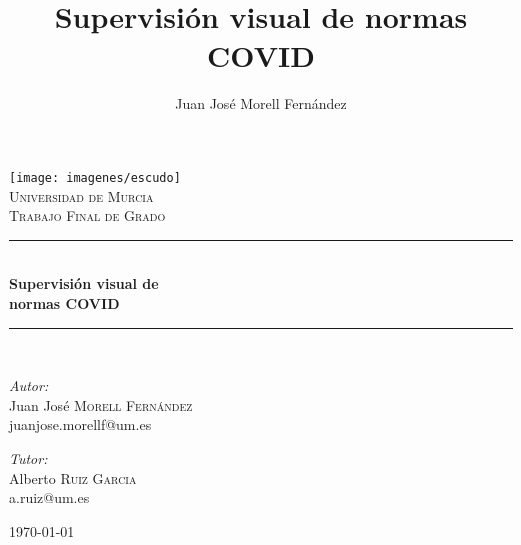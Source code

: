 \documentclass[a4paper,12pt]{book}
\newcommand{\HRule}{\rule{\linewidth}{0.5mm}}
\begin{document}
\title{Supervisión visual de normas COVID}
\author{Juan José Morell Fernández}

\begin{titlepage}
 
\begin{center}
 
\vfill

\texttt{[image: imagenes/escudo]}\\[2.5cm]
 
\textsc{\LARGE Universidad de Murcia}\\[0.5cm]
 
\textsc{\Large Trabajo Final de Grado}\\[0.5cm]
 
\HRule \\[0.4cm]
{ \huge \bfseries Supervisión visual de}\\[0.4cm]
{ \huge \bfseries normas COVID}\\[0.4cm]
\HRule \\[1.5cm]
 
\begin{minipage}{0.4\textwidth}
\begin{flushleft} \large
\emph{Autor:}\\
Juan José \textsc{Morell Fernández}\\
juanjose.morellf@um.es
\end{flushleft}
\end{minipage}
\begin{minipage}{0.4\textwidth}
\begin{flushright} \large
\emph{Tutor:} \\
Alberto \textsc{Ruiz Garcia}\\
a.ruiz@um.es
\end{flushright}
\end{minipage}
 
\vfill
 
{\large \today}
 
\end{center}
 
\end{titlepage}

\let\cleardoublepage\newpage

\clearpage{\pagestyle{empty}\cleardoublepage}

%
\clearpage{\pagestyle{empty}\cleardoublepage}
\end{document}
